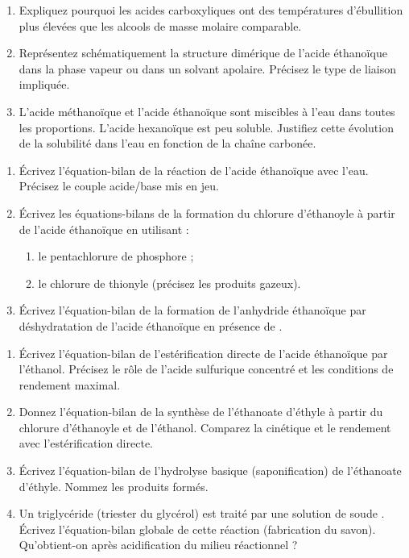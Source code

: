 \documentclass[11pt]{article}
\begin{document}
\begin{exercice}
\begin{enumerate}
    \item Expliquez pourquoi les acides carboxyliques ont des températures d'ébullition plus élevées que les alcools de masse molaire comparable.
    \item Représentez schématiquement la structure dimérique de l'acide éthanoïque dans la phase vapeur ou dans un solvant apolaire. Précisez le type de liaison impliquée.
    \item L'acide méthanoïque et l'acide éthanoïque sont miscibles à l'eau dans toutes les proportions. L'acide hexanoïque est peu soluble. Justifiez cette évolution de la solubilité dans l'eau en fonction de la chaîne carbonée.
\end{enumerate}
\end{exercice}

\begin{exercice}
\begin{enumerate}
    \item Écrivez l'équation-bilan de la réaction de l'acide éthanoïque avec l'eau. Précisez le couple acide/base mis en jeu.
    \item Écrivez les équations-bilans de la formation du chlorure d'éthanoyle à partir de l'acide éthanoïque en utilisant : 
    \begin{enumerate}
        \item le pentachlorure de phosphore  ;
        \item le chlorure de thionyle  (précisez les produits gazeux).
    \end{enumerate}
    \item Écrivez l'équation-bilan de la formation de l'anhydride éthanoïque par déshydratation de l'acide éthanoïque en présence de .
\end{enumerate}
\end{exercice}

\begin{exercice}
\begin{enumerate}
    \item Écrivez l'équation-bilan de l'estérification directe de l'acide éthanoïque par l'éthanol. Précisez le rôle de l'acide sulfurique concentré et les conditions de rendement maximal.
    \item Donnez l'équation-bilan de la synthèse de l'éthanoate d'éthyle à partir du chlorure d'éthanoyle et de l'éthanol. Comparez la cinétique et le rendement avec l'estérification directe.
    \item Écrivez l'équation-bilan de l'hydrolyse basique (saponification) de l'éthanoate d'éthyle. Nommez les produits formés.
    \item Un triglycéride (triester du glycérol) est traité par une solution de soude . Écrivez l'équation-bilan globale de cette réaction (fabrication du savon). Qu'obtient-on après acidification du milieu réactionnel ?
\end{enumerate}
\end{exercice}
\end{document}
